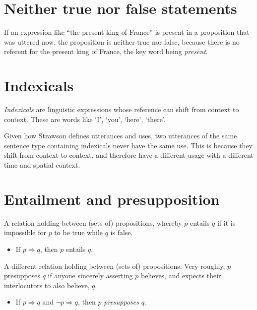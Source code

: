 \section{Neither true nor false statements}

If an expression like ``the present king of France'' is present in a proposition that was uttered now, the proposition is neither true nor false, because there is no referent for the present king of France, the key word being \emph{present}.

\section{Indexicals}

\begin{definition}
\emph{Indexicals} are linguistic expressions whose reference can shift from context to context. These are words like `I', `you', `here', `there'.
\end{definition}

Given how Strawson defines utterances and uses, two utterances of the same sentence type containing indexicals never have the same use. This is because they shift from context to context, and therefore have a different usage with a different time and spatial context.

\section{Entailment and presupposition}

\begin{definition}[Entailment]
A relation holding between (sets of) propositions, whereby $p$ entails $q$ if it is impossible for $p$ to be true while $q$ is false.
\begin{itemize}
  \item If $p \Rightarrow q$, then $p$ entails $q$.
\end{itemize}
\end{definition}

\begin{definition}[Presupposition]
A different relation holding between (sets of) propositions. Very roughly, $p$ presupposes $q$ if anyone sincerely asserting $p$ believes, and expects their interlocutors to also believe, $q$.
\begin{itemize}
  \item If $p \Rightarrow q$ and $\neg p \Rightarrow q$, then $p$ \emph{presupposes} $q$.
\end{itemize}
\end{definition}

